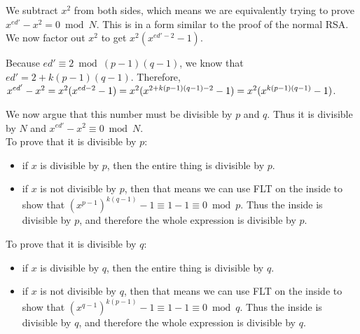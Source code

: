 \documentclass[]{article}
\begin{document}
\begin{qunlist}
{{\begin{enumerate}
We subtract $x^2$ from both sides, which means we are equivalently trying to prove  $x^{ed'} - x^2 = 0 \bmod{N}$. This is in a form similar to the proof of the normal RSA.
 We now factor out $x^2$ to get $x^2(x^{ed'-2} - 1)$.

 Because $ed' \equiv 2 \bmod{(p-1)(q-1)}$, we know that $ed' = 2 + k(p-1)(q-1)$. Therefore,
  \\ $x^{ed'} - x^2
  \\ = x^2(x^{ed - 2} - 1)  
  \\  = x^2(x^{2+ k(p-1)(q-1) -2} - 1) \\ = x^2(x^{k(p-1)(q-1)} - 1)$. 
  
We now argue that this number must be divisible by $p$ and $q$. Thus it is divisible by $N$ and $x^{ed'} -x^2 \equiv 0 \bmod{N}$. \\
To prove that it is divisible by $p$:
\begin{itemize}
\item if $x$ is divisible by $p$, then the entire thing is divisible by $p$. 
\item if $x$ is not divisible by $p$, then that means we can use FLT on the inside to show that $(x^{p-1})^{k(q-1)} -1 \equiv 1 -1 \equiv 0 \bmod{p} $. Thus the inside is divisible by $p$, and therefore the whole expression is divisible by $p$.
\end{itemize} 
To prove that it is divisible by $q$:
\begin{itemize}
\item if $x$ is divisible by $q$, then the entire thing is divisible by $q$. 
\item if $x$ is not divisible by $q$, then that means we can use FLT on the inside to show that $(x^{q-1})^{k(p-1) } -1 \equiv 1 -1 \equiv 0 \bmod{q} $. Thus the inside is divisible by $q$, and therefore the whole expression is divisible by $q$.
\end{itemize} 

  
  
\end{enumerate}
}}\fi




\end{qunlist}
\end{document}
